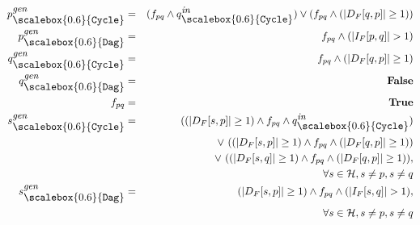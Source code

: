\documentclass[letterpaper]{sig-alternate}
\newcommand{\p}{\ensuremath{p}}
\newcommand{\q}{\ensuremath{q}}
\newcommand{\s}{\ensuremath{s}}
\newcommand{\heap}{\ensuremath{\mathcal{H}}}
\newcommand{\subC}{\mbox{\scalebox{0.6}{\Cycle}}}
\newcommand{\subD}{\mbox{\scalebox{0.6}{\Dag}}}
\newcommand{\din}{\mbox{\footnotesize\em in}}
\newcommand{\dgen}{\mbox{\footnotesize\em gen}}
\newcommand{\GenC}[1]{\ensuremath{{#1}_{\subC}^{\dgen}}}
\newcommand{\GenD}[1]{\ensuremath{{#1}_{\subD}^{\dgen}}}
\newcommand{\InC}[1]{\ensuremath{{#1}_{\subC}^{\din}}}
\newcommand{\num}[1]{\ensuremath{|#1|}}
\newcommand{\DFM}[2]{\ensuremath{D_F[#1,#2]}}
\newcommand{\IFM}[2]{\ensuremath{I_F[#1,#2]}}
\newcommand{\Dag}{{\tt Dag}}
\newcommand{\Cycle}{{\tt Cycle}}
\newcommand{\false}{\textbf{False}}
\newcommand{\true}{\textbf{True}}
\begin{document}
\begin{enumerate}
  \begin{eqnarray*}
    \GenC{p}   &= & (f_{\p\q} \wedge \InC{q}) \vee (f_{\p\q}
    \wedge (\num{\DFM{\q}{\p}} \geq 1)) \\ %
    \GenD{p}   &=&  f_{\p\q} \wedge (\num{\IFM{\p}{\q}} > 1)	\\
    \GenC{q}   &= & f_{\p\q} \wedge (\num{\DFM{\q}{\p}} \geq 1) \\ %
	\GenD{q} &=& \false\\ 
    f_{\p\q} &=& \true \\
    \GenC{\s} &=&  ((\num{\DFM{\s}{\p}} \geq 1) \wedge f_{\p\q}
    \wedge \InC{q}) \\
    && \vee\ ((\num{\DFM{\s}{\p}} \geq 1) \wedge f_{\p\q} \wedge
    (\num{\DFM{\q}{\p}} \geq 1)) \\ 
    && \vee\ ((\num{\DFM{\s}{\q}} \geq 1) \wedge f_{\p\q}
    \wedge (\num{\DFM{\q}{\p}} \geq 1)),  \\ %
    && \qquad \qquad  \forall \s \in \heap, \s \not= \p, \s \not=\q \\
    \GenD{\s}   &=& (\num{\DFM{\s}{\p}} \geq 1) \wedge
    f_{\p\q} \wedge (\num{\IFM{\s}{\q}} > 1), \\ %
    && \qquad \qquad \forall \s \in \heap, \s \not= \p, \s \not=\q 
  \end{eqnarray*}


\end{enumerate}
\end{document}
